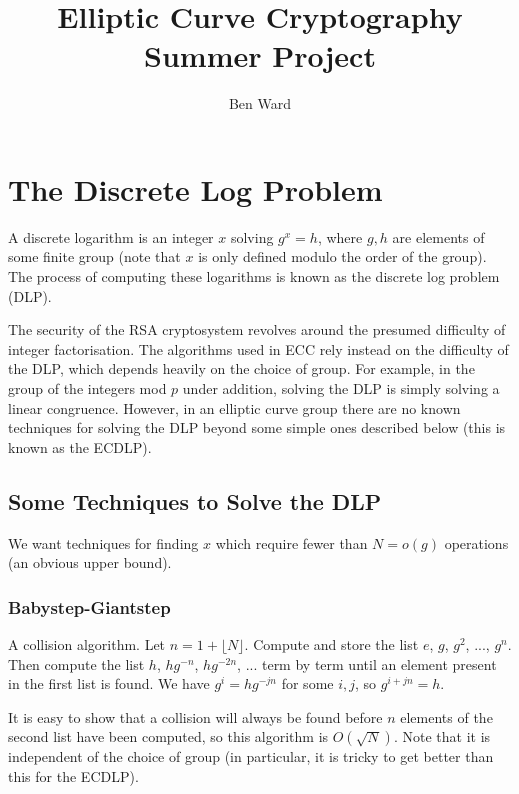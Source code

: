 \documentclass[a4paper]{article}
\title{Elliptic Curve Cryptography Summer Project}
\author{Ben Ward}
\begin{document}
\maketitle

\section{The Discrete Log Problem}
A discrete logarithm is an integer $x$ solving $g^x=h$, where $g, h$ are elements of some finite group (note that $x$ is only defined modulo the order of the group). The process of computing these logarithms is known as the discrete log problem (DLP).

The security of the RSA cryptosystem revolves around the presumed difficulty of integer factorisation. The algorithms used in ECC rely instead on the difficulty of the DLP, which depends heavily on the choice of group. For example, in the group of the integers mod $p$ under addition, solving the DLP is simply solving a linear congruence. However, in an elliptic curve group there are no known techniques for solving the DLP beyond some simple ones described below (this is known as the ECDLP).

\subsection{Some Techniques to Solve the DLP}
We want techniques for finding $x$ which require fewer than $N=o(g)$ operations (an obvious upper bound).
\subsubsection{Babystep-Giantstep}
A collision algorithm. Let $n=1+\lfloor N\rfloor$. Compute and store the list $e$, $g$, $g^2$, ..., $g^n$. Then compute the list $h$, $hg^{-n}$, $hg^{-2n}$, ... term by term until an element present in the first list is found. We have $g^i=hg^{-jn}$ for some $i,j$, so $g^{i+jn}=h$.

It is easy to show that a collision will always be found before $n$ elements of the second list have been computed, so this algorithm is $O(\sqrt{N})$. Note that it is independent of the choice of group (in particular, it is tricky to get better than this for the ECDLP).
\end{document}
